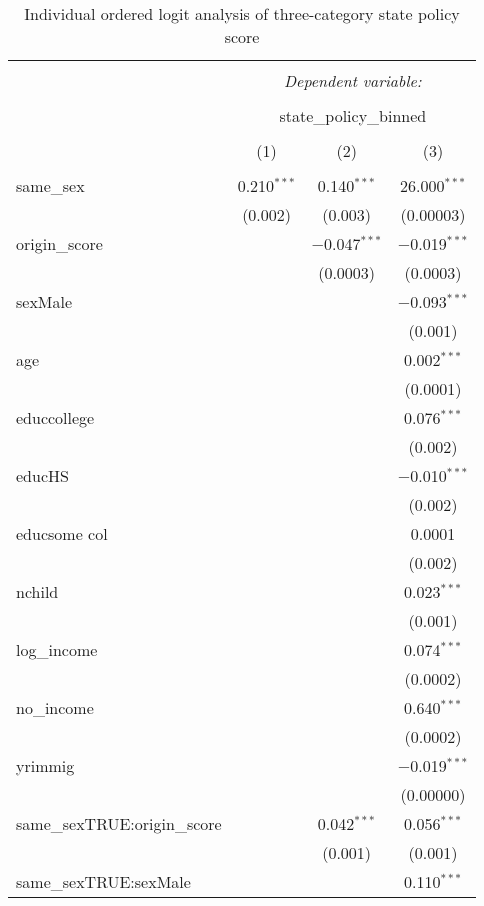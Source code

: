 \documentclass[11pt,]{article}
\begin{document}
\begin{table}[!htbp] \centering 
  \caption{Individual ordered logit analysis of three-category state policy score} 
  \label{tab:ord} 
\begin{tabular}{@{\extracolsep{5pt}}lccc} 
\\[-1.8ex]\hline 
\hline \\[-1.8ex] 
 & \multicolumn{3}{c}{\textit{Dependent variable:}} \\ 
\cline{2-4} 
\\[-1.8ex] & \multicolumn{3}{c}{state\_policy\_binned} \\ 
\\[-1.8ex] & (1) & (2) & (3)\\ 
\hline \\[-1.8ex] 
 same\_sex & 0.210$^{***}$ & 0.140$^{***}$ & 26.000$^{***}$ \\ 
  & (0.002) & (0.003) & (0.00003) \\ 
  origin\_score &  & $-$0.047$^{***}$ & $-$0.019$^{***}$ \\ 
  &  & (0.0003) & (0.0003) \\ 
  sexMale &  &  & $-$0.093$^{***}$ \\ 
  &  &  & (0.001) \\ 
  age &  &  & 0.002$^{***}$ \\ 
  &  &  & (0.0001) \\ 
  educcollege &  &  & 0.076$^{***}$ \\ 
  &  &  & (0.002) \\ 
  educHS &  &  & $-$0.010$^{***}$ \\ 
  &  &  & (0.002) \\ 
  educsome col &  &  & 0.0001 \\ 
  &  &  & (0.002) \\ 
  nchild &  &  & 0.023$^{***}$ \\ 
  &  &  & (0.001) \\ 
  log\_income &  &  & 0.074$^{***}$ \\ 
  &  &  & (0.0002) \\ 
  no\_income &  &  & 0.640$^{***}$ \\ 
  &  &  & (0.0002) \\ 
  yrimmig &  &  & $-$0.019$^{***}$ \\ 
  &  &  & (0.00000) \\ 
  same\_sexTRUE:origin\_score &  & 0.042$^{***}$ & 0.056$^{***}$ \\ 
  &  & (0.001) & (0.001) \\ 
  same\_sexTRUE:sexMale &  &  & 0.110$^{***}$ \\ 

\end{tabular}
\end{table}
\end{document}
